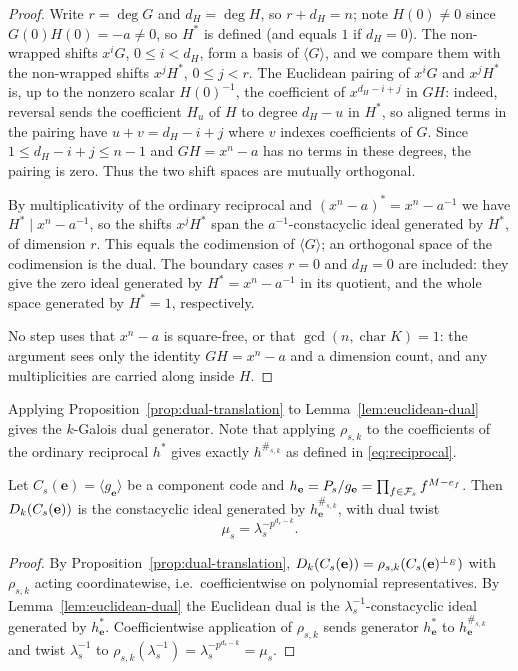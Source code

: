 \begin{proof}
Write $r=\deg G$ and $d_H=\deg H$, so $r+d_H=n$; note $H(0)\neq0$ since
$G(0)H(0)=-a\neq0$, so $H^\ast$ is defined (and equals $1$ if $d_H=0$).  The
non-wrapped shifts $x^iG$, $0\leq i<d_H$, form a basis of $\langle G\rangle$,
and we compare them with the non-wrapped shifts $x^jH^\ast$, $0\leq j<r$.  The
Euclidean pairing of $x^iG$ and $x^jH^\ast$ is, up to the nonzero scalar
$H(0)^{-1}$, the coefficient of $x^{d_H-i+j}$ in $GH$: indeed, reversal sends
the coefficient $H_u$ of $H$ to degree $d_H-u$ in $H^\ast$, so aligned terms in
the pairing have $u+v=d_H-i+j$ where $v$ indexes coefficients of $G$.  Since
$1\leq d_H-i+j\leq n-1$ and $GH=x^n-a$ has no terms in these degrees, the
pairing is zero.  Thus the two shift spaces are mutually orthogonal.

By multiplicativity of the ordinary reciprocal and
$(x^n-a)^\ast=x^n-a^{-1}$ we have $H^\ast\mid x^n-a^{-1}$, so the shifts
$x^jH^\ast$ span the $a^{-1}$-constacyclic ideal generated by $H^\ast$, of
dimension $r$.  This equals the codimension of $\langle G\rangle$; an
orthogonal space of the codimension is the dual.  The boundary cases
$r=0$ and $d_H=0$ are included: they give the zero ideal generated by
$H^\ast=x^n-a^{-1}$ in its quotient, and the whole space generated by
$H^\ast=1$, respectively.

No step uses that $x^n-a$ is square-free, or that $\gcd(n,\operatorname{char}K)=1$:
the argument sees only the identity $GH=x^n-a$ and a dimension count, and any
multiplicities are carried along inside $H$.
\end{proof}

Applying Proposition~\ref{prop:dual-translation} to
Lemma~\ref{lem:euclidean-dual} gives the $k$-Galois dual generator.  Note that
applying $\rho_{s,k}$ to the coefficients of the ordinary reciprocal $h^\ast$
gives exactly $h^{\#_{s,k}}$ as defined in \eqref{eq:reciprocal}.

\begin{theorem}\label{thm:dual-generator}
Let $C_s(\mathbf{e})=\langle g_{\mathbf{e}}\rangle$ be a component code and
$h_{\mathbf{e}}=P_s/g_{\mathbf{e}}=\prod_{f\in\mathcal F_s}f^{M-e_f}$.  Then
$D_k(C_s(\mathbf{e}))$ is the constacyclic ideal generated by
$h_{\mathbf{e}}^{\#_{s,k}}$, with dual twist
\[
\mu_s=\lambda_s^{-p^{d_s-k}}.
\]
\end{theorem}

\begin{proof}
By Proposition~\ref{prop:dual-translation},
$D_k(C_s(\mathbf{e}))=\rho_{s,k}(C_s(\mathbf{e})^{\perp_{E}})$ with $\rho_{s,k}$
acting coordinatewise, i.e.\ coefficientwise on polynomial representatives.
By Lemma~\ref{lem:euclidean-dual} the Euclidean dual is the
$\lambda_s^{-1}$-constacyclic ideal generated by $h_{\mathbf{e}}^\ast$.
Coefficientwise application of $\rho_{s,k}$ sends generator
$h_{\mathbf{e}}^\ast$ to $h_{\mathbf{e}}^{\#_{s,k}}$ and twist $\lambda_s^{-1}$
to $\rho_{s,k}(\lambda_s^{-1})=\lambda_s^{-p^{d_s-k}}=\mu_s$.
\end{proof}

